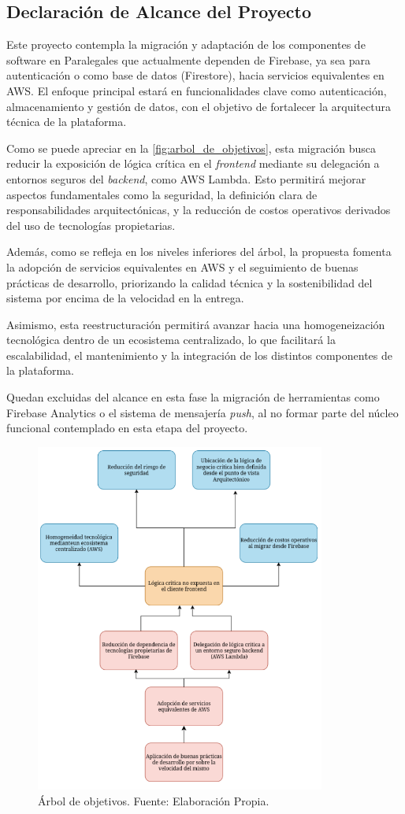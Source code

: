 \subsection{Declaración de Alcance del Proyecto}

Este proyecto contempla la migración y adaptación de los componentes de software en Paralegales que actualmente dependen de Firebase, ya sea para autenticación o como base de datos (Firestore), hacia servicios equivalentes en AWS. El enfoque principal estará en funcionalidades clave como autenticación, almacenamiento y gestión de datos, con el objetivo de fortalecer la arquitectura técnica de la plataforma.

Como se puede apreciar en la \autoref{fig:arbol_de_objetivos}, esta migración busca reducir la exposición de lógica crítica en el \textit{frontend} mediante su delegación a entornos seguros del \textit{backend}, como AWS Lambda. Esto permitirá mejorar aspectos fundamentales como la seguridad, la definición clara de responsabilidades arquitectónicas, y la reducción de costos operativos derivados del uso de tecnologías propietarias.

Además, como se refleja en los niveles inferiores del árbol, la propuesta fomenta la adopción de servicios equivalentes en AWS y el seguimiento de buenas prácticas de desarrollo, priorizando la calidad técnica y la sostenibilidad del sistema por encima de la velocidad en la entrega.

Asimismo, esta reestructuración permitirá avanzar hacia una homogeneización tecnológica dentro de un ecosistema centralizado, lo que facilitará la escalabilidad, el mantenimiento y la integración de los distintos componentes de la plataforma.

Quedan excluidas del alcance en esta fase la migración de herramientas como Firebase Analytics o el sistema de mensajería \textit{push}, al no formar parte del núcleo funcional contemplado en esta etapa del proyecto.

\begin{figure}[H]
  \centering
  \includegraphics[width=0.85\textwidth]{img/figures/fig7-arbol-de-objetivos.png}
  \caption{Árbol de objetivos. Fuente: Elaboración Propia.}
  \label{fig:arbol_de_objetivos}
\end{figure}
